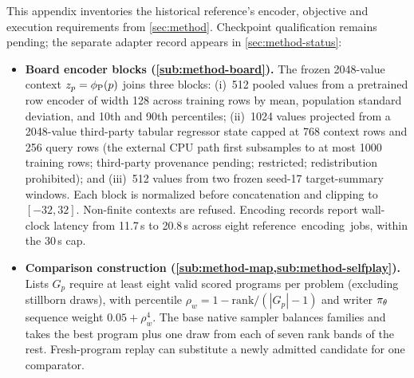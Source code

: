 This appendix inventories the historical reference's encoder, objective
and execution requirements from \cref{sec:method}. Checkpoint
qualification remains pending; the separate adapter record appears in
\cref{sec:method-status}:
\begin{itemize}[leftmargin=1.4em,itemsep=2pt,topsep=3pt]
  \item \textbf{Board encoder blocks (\cref{sub:method-board}).} The frozen
  \num{2048}-value context $z_p = \phi_{\mathrm{P}}(p)$ joins three blocks:
  (i)~512 pooled values from a pretrained row encoder of width 128
  across training rows by mean, population standard deviation, and 10th and 90th
  percentiles; (ii)~\num{1024} values projected from a \num{2048}-value third-party tabular
  regressor state capped at 768 context rows and 256 query
  rows (the external CPU path first subsamples to at most \num{1000} training
  rows; third-party provenance pending; restricted; redistribution prohibited); and (iii)~512 values from two
  frozen seed-17 target-summary windows. Each block is normalized before
  concatenation and clipping to $[-32,32]$. Non-finite contexts are refused. Encoding records
  report wall-clock latency from 11.7\,s to 20.8\,s across eight \mbox{reference
  encoding jobs,} within the 30\,s cap.
  \item \textbf{Comparison construction (\cref{sub:method-map,sub:method-selfplay}).}
  Lists $G_p$ require at least eight valid scored programs per problem (excluding
  stillborn draws), with
  percentile $\rho_w = 1 - \mathrm{rank}/\allowbreak{(|G_p|-1)}$ and writer $\pi_{\theta}$ sequence weight
  $0.05 + \rho_w^4$. The base native sampler balances families and takes
  the best program plus one draw from each of seven rank bands of the rest.
  Fresh-program replay can substitute a newly admitted candidate for
  one comparator.


\end{itemize}
